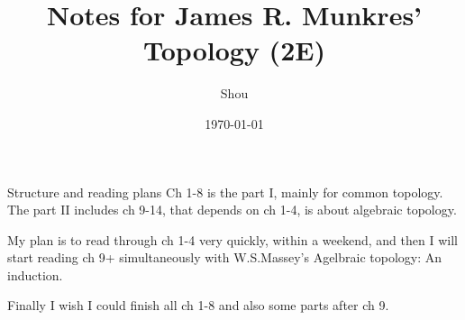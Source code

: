 \documentclass{report}
\theoremstyle{definition}
\begin{document}
\title{Notes for James R. Munkres' Topology (2E)}
\author{Shou}
\date{\today}

\maketitle
\tableofcontents

\setcounter{chapter}{-1}
\begin{chapter}{Structure and reading plans}
Ch 1-8 is the part I, mainly for common topology. The part II includes
ch 9-14, that depends on ch 1-4, is about algebraic topology.

My plan is to read through ch 1-4 very quickly, within a weekend, and
then I will start reading ch 9+ simultaneously with W.S.Massey's
Agelbraic topology: An induction.

Finally I wish I could finish all ch 1-8 and also some parts after ch 9.
\end{chapter}
\end{document}
